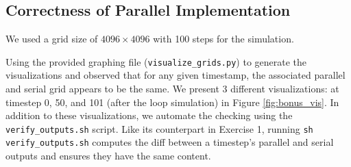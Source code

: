 \documentclass[a4paper,10pt]{article}
\begin{document}
\subsection{Correctness of Parallel Implementation}
We used a grid size of $4096 \times 4096$ with 100 steps for the simulation.

Using the provided graphing file (\verb|visualize_grids.py|) to generate the visualizations and observed that for any given timestamp, the associated parallel and serial grid appears to be the same. We present 3 different visualizations: at timestep 0, 50, and 101 (after the loop simulation) in Figure \ref{fig:bonus_vis}. In addition to these visualizations, we automate the checking using the \verb|verify_outputs.sh| script. Like its counterpart in Exercise 1, running \verb|sh verify_outputs.sh| computes the diff between a timestep's parallel and serial outputs and ensures they have the same content.
\end{document}
